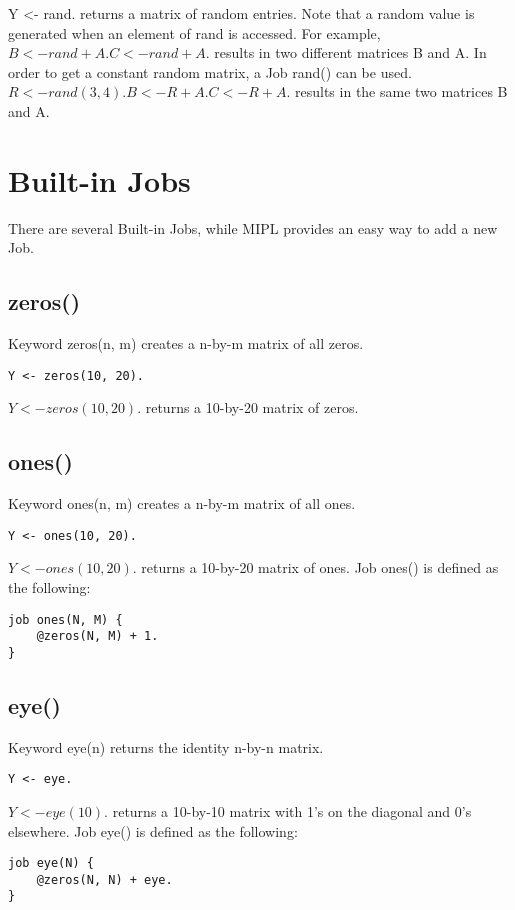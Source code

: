 \documentclass[prodmode,acmtecs]{acmsmall}
\begin{document}
Y <- rand. returns a matrix of random entries. Note that a random value
is generated when an element of rand is accessed. For example,
$B <- rand + A. C <- rand + A.$ results in two different matrices B and A.
In order to get a constant random matrix, a Job rand() can be used.
$R <- rand(3,4). B <- R + A. C <- R + A.$ results in the same two matrices B
and A.


\section{Built-in Jobs}
There are several Built-in Jobs, while MIPL provides an easy way
to add a new Job.
\medskip

\subsection{zeros()}
Keyword zeros(n, m) creates a n-by-m matrix of all zeros.
\begin{lstlisting}
Y <- zeros(10, 20).
\end{lstlisting}

$Y <- zeros(10, 20).$ returns a 10-by-20 matrix of zeros.
\medskip

\subsection{ones()}
Keyword ones(n, m) creates a n-by-m matrix of all ones.
\begin{lstlisting}
Y <- ones(10, 20).
\end{lstlisting}

$Y <- ones(10, 20).$ returns a 10-by-20 matrix of ones.
Job ones() is defined as the following:
\begin{lstlisting}
job ones(N, M) {
    @zeros(N, M) + 1.
}
\end{lstlisting}
\medskip

\subsection{eye()}
Keyword eye(n) returns the identity n-by-n matrix.
\begin{lstlisting}
Y <- eye.
\end{lstlisting}

$Y <- eye(10).$ returns a 10-by-10 matrix with 1's on the diagonal and 0's elsewhere.
Job eye() is defined as the following:
\begin{lstlisting}
job eye(N) {
    @zeros(N, N) + eye.
} 
\end{lstlisting}
\medskip
\end{document}
